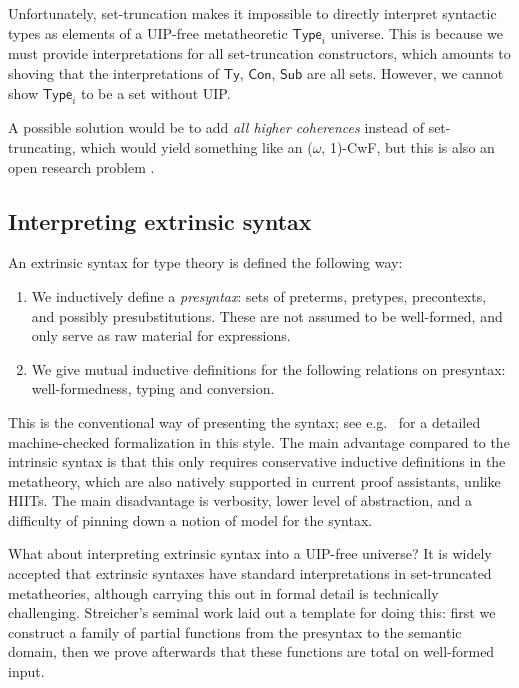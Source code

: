 \documentclass[dvipsnames]{lmcs} %
\newcommand{\Con}{\mathsf{Con}}
\newcommand{\Ty}{\mathsf{Ty}}
\newcommand{\Sub}{\mathsf{Sub}}
\newcommand{\1}{\mathsf{1}} \renewcommand{\Pr}{\mathsf{Pr}}
\theoremstyle{plain}\newtheorem{satz}[thm]{Satz} %
\begin{document}
Unfortunately, set-truncation makes it impossible to directly interpret
syntactic types as elements of a UIP-free metatheoretic $\mathsf{Type}_i$
universe. This is because we must provide interpretations for all set-truncation
constructors, which amounts to shoving that the interpretations of $\Ty$,
$\Con$, $\Sub$ are all sets. However, we cannot show $\mathsf{Type}_i$ to be a
set without UIP.

A possible solution would be to add \emph{all higher coherences} instead of
set-truncating, which would yield something like an ($\omega$, 1)-CwF, but this
is also an open research problem \cite{altenkirch2018towards, finster2019structure}.

\subsection{Interpreting extrinsic syntax}
An extrinsic syntax for type theory is defined the following way:
\begin{enumerate}
\item We inductively define a \emph{presyntax}: sets of preterms, pretypes,
      precontexts, and possibly presubstitutions. These are not assumed to
      be well-formed, and only serve as raw material for expressions.
\item We give mutual inductive definitions for the following relations on presyntax:
      well-formedness, typing and conversion.
\end{enumerate}

This is the conventional way of presenting the syntax; see
e.g.\ \cite{winterhalter2019eliminating} for a detailed machine-checked
formalization in this style. The main advantage compared to the intrinsic syntax
is that this only requires conservative inductive definitions in the metatheory,
which are also natively supported in current proof assistants, unlike HIITs. The
main disadvantage is verbosity, lower level of abstraction, and a difficulty of
pinning down a notion of model for the syntax.

What about interpreting extrinsic syntax into a UIP-free universe? It is widely
accepted that extrinsic syntaxes have standard interpretations in set-truncated
metatheories, although carrying this out in formal detail is technically
challenging. Streicher's seminal work \cite{streicher2012semantics} laid out a
template for doing this: first we construct a family of partial functions from
the presyntax to the semantic domain, then we prove afterwards that these
functions are total on well-formed input.
\end{document}
